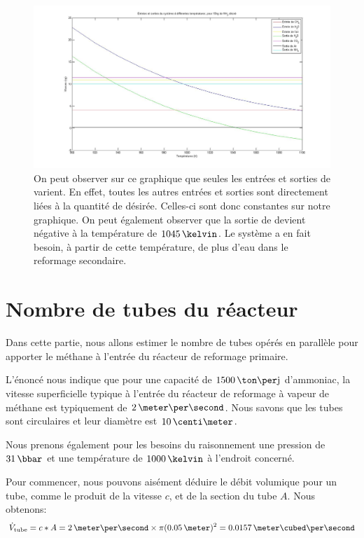 \documentclass[a4paper,12pt]{article}
\begin{document}
\begin{figure}
    \begin{center}
        \includegraphics[width=\textwidth]{graphe1}
        \caption{On peut observer sur ce graphique que seules les entrées et sorties de
             varient.
            En effet, toutes les autres entrées et sorties sont directement
            liées à la quantité de  désirée.
            Celles-ci sont donc constantes sur notre graphique.
            On peut également observer que la sortie de  devient négative
            à la température de $1045\,\kelvin$.
            Le système a en fait besoin, à partir de cette température,
            de plus d'eau dans le reformage secondaire.
        }
        \label{fig:graphe}
    \end{center}
\end{figure}

\section{Nombre de tubes du réacteur}

Dans cette partie, nous allons estimer le nombre de tubes opérés
en parallèle pour apporter le méthane à l'entrée du réacteur de reformage primaire.

L’énoncé nous indique que pour une capacité de $1500\,\ton\per\jour$ d’ammoniac,
la vitesse superficielle typique à l’entrée du réacteur de reformage
à vapeur de méthane est typiquement de $2\,\meter\per\second$.
Nous savons que les tubes sont circulaires et leur diamètre est $10\,\centi\meter$.

Nous prenons également pour les besoins du raisonnement
une pression de $31\,\bbar$ et une température de $1000\,\kelvin$
à l'endroit concerné.

Pour commencer, nous pouvons aisément déduire le débit volumique pour un tube,
comme le produit de la vitesse $c$, et de la section du tube $A$.
Nous obtenons:
\begin{equation*}
    \dot{V}\ind{tube} = c*A = 2\,\meter\per\second \times \pi(0.05\,\meter)^2
    = 0.0157\,\meter\cubed\per\second
\end{equation*}
\end{document}
